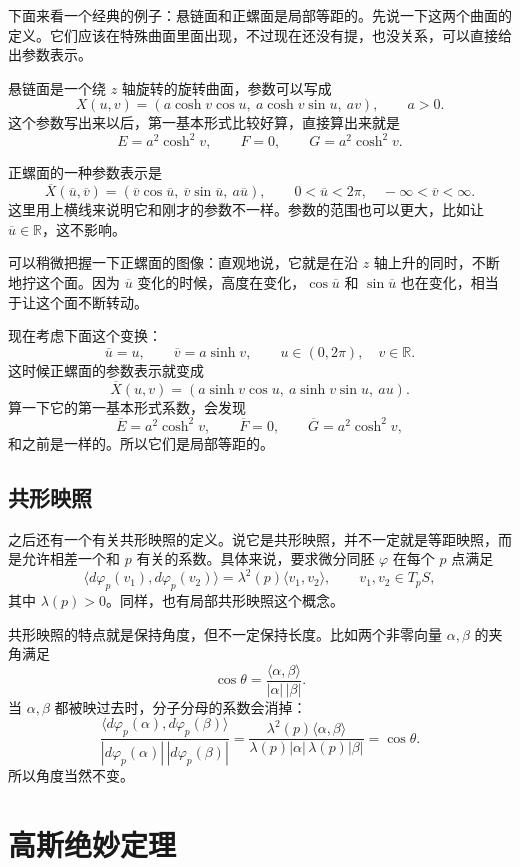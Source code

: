 \documentclass[UTF8,11pt,a4paper]{ctexart}
\newcommand{\ip}[2]{\langle #1,#2\rangle}
\begin{document}
下面来看一个经典的例子：悬链面和正螺面是局部等距的。先说一下这两个曲面的定义。它们应该在特殊曲面里面出现，不过现在还没有提，也没关系，可以直接给出参数表示。

悬链面是一个绕 $z$ 轴旋转的旋转曲面，参数可以写成
\[
X(u,v)=(a\cosh v\cos u,\ a\cosh v\sin u,\ av),\qquad a>0.
\]
这个参数写出来以后，第一基本形式比较好算，直接算出来就是
\[
E=a^2\cosh^2v,\qquad F=0,\qquad G=a^2\cosh^2v.
\]

正螺面的一种参数表示是
\[
\overline X(\overline u,\overline v)
=(\overline v\cos\overline u,\ \overline v\sin\overline u,\ a\overline u),
\qquad 0<\overline u<2\pi,\quad -\infty<\overline v<\infty.
\]
这里用上横线来说明它和刚才的参数不一样。参数的范围也可以更大，比如让 $\overline u\in\mathbb R$，这不影响。

可以稍微把握一下正螺面的图像：直观地说，它就是在沿 $z$ 轴上升的同时，不断地拧这个面。因为 $\overline u$ 变化的时候，高度在变化，$\cos\overline u$ 和 $\sin\overline u$ 也在变化，相当于让这个面不断转动。

现在考虑下面这个变换：
\[
\overline u=u,\qquad \overline v=a\sinh v,
\qquad u\in(0,2\pi),\quad v\in\mathbb R.
\]
这时候正螺面的参数表示就变成
\[
\overline X(u,v)=(a\sinh v\cos u,\ a\sinh v\sin u,\ au).
\]
算一下它的第一基本形式系数，会发现
\[
\overline E=a^2\cosh^2v,\qquad
\overline F=0,\qquad
\overline G=a^2\cosh^2v,
\]
和之前是一样的。所以它们是局部等距的。

\subsection{共形映照}

之后还有一个有关共形映照的定义。说它是共形映照，并不一定就是等距映照，而是允许相差一个和 $p$ 有关的系数。具体来说，要求微分同胚 $\varphi$ 在每个 $p$ 点满足
\[
\ip{d\varphi_p(v_1)}{d\varphi_p(v_2)}
=\lambda^2(p)\ip{v_1}{v_2},\qquad v_1,v_2\in T_pS,
\]
其中 $\lambda(p)>0$。同样，也有局部共形映照这个概念。

共形映照的特点就是保持角度，但不一定保持长度。比如两个非零向量 $\alpha,\beta$ 的夹角满足
\[
\cos\theta=\frac{\ip{\alpha}{\beta}}{|\alpha|\,|\beta|}.
\]
当 $\alpha,\beta$ 都被映过去时，分子分母的系数会消掉：
\[
\frac{\ip{d\varphi_p(\alpha)}{d\varphi_p(\beta)}}
{|d\varphi_p(\alpha)|\,|d\varphi_p(\beta)|}
=\frac{\lambda^2(p)\ip{\alpha}{\beta}}
{\lambda(p)|\alpha|\,\lambda(p)|\beta|}
=\cos\theta.
\]
所以角度当然不变。

\section{高斯绝妙定理}
\end{document}
